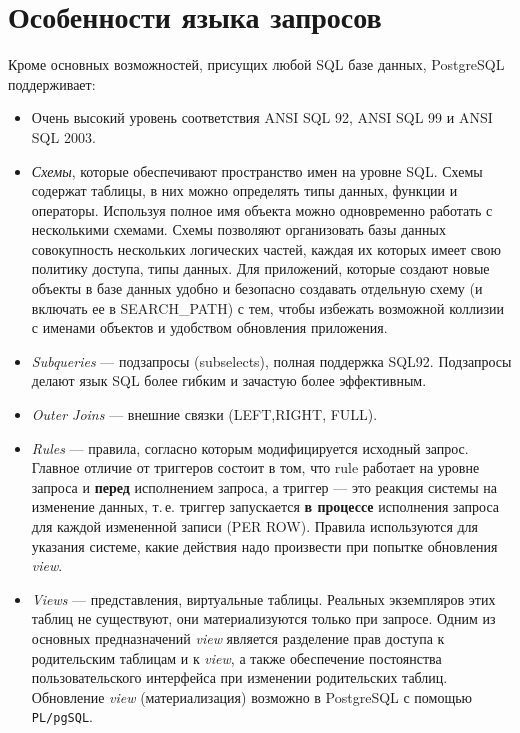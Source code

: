 \documentclass[a4paper,12pt,notitlepage,headsepline,pdftex]{scrartcl}
\begin{document}
\section{Особенности языка запросов}
  Кроме основных возможностей, присущих любой SQL базе данных, PostgreSQL
  поддерживает:
  \begin{itemize}
    \item Очень высокий уровень соответствия ANSI SQL 92, ANSI SQL 99 и ANSI
      SQL 2003.
    \item \emph{Схемы}, которые обеспечивают пространство имен на уровне
      SQL.
      Схемы содержат таблицы, в них можно определять типы данных, функции и
      операторы.
      Используя полное имя объекта можно одновременно работать с несколькими
      схемами.
      Схемы позволяют организовать базы данных совокупность нескольких
      логических частей, каждая их которых имеет свою политику доступа, типы
      данных.
      Для приложений, которые создают новые объекты в базе данных удобно и
      безопасно создавать отдельную схему (и включать ее в SEARCH\_PATH) с
      тем, чтобы избежать возможной коллизии с именами объектов и удобством
      обновления приложения.
    \item \emph{Subqueries} --- подзапросы (subselects), полная поддержка
      SQL92.
      Подзапросы делают язык SQL более гибким и зачастую более эффективным.
    \item \emph{Outer Joins} --- внешние связки (LEFT,RIGHT, FULL).
    \item \emph{Rules} --- правила, согласно которым модифицируется исходный
      запрос.
      Главное отличие от триггеров состоит в том, что rule работает на
      уровне запроса и \textbf{перед} исполнением запроса, а триггер --- это
      реакция системы на изменение данных, т.\,е. триггер запускается
      \textbf{в процессе} исполнения запроса для каждой измененной записи
      (PER ROW).
      Правила используются для указания системе, какие действия надо
      произвести при попытке обновления \emph{view}.
    \item \emph{Views} --- представления, виртуальные таблицы.
      Реальных экземпляров этих таблиц не существуют, они материализуются
      только при запросе.
      Одним из основных предназначений \emph{view} является разделение прав
      доступа к родительским таблицам и к \emph{view}, а также обеспечение
      постоянства пользовательского интерфейса при изменении родительских
      таблиц.
      Обновление \emph{view} (материализация) возможно в PostgreSQL с
      помощью \verb'PL/pgSQL'.

\end{itemize}
\end{document}
